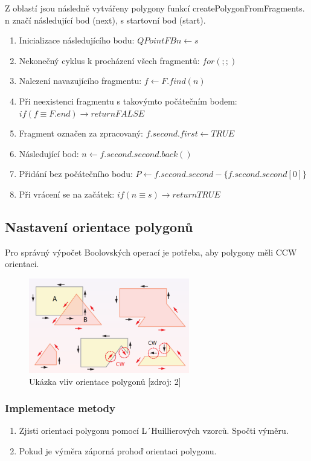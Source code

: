 \documentclass[a4paper, 12pt]{article}
\begin{document}
Z oblastí jsou následně vytvářeny polygony funkcí createPolygonFromFragments. n značí následující bod (next), s startovní bod (start). 

\begin{enumerate}
\item Inicializace následujícího bodu: $QPointFB n \leftarrow s$
\item Nekonečný cyklus k procházení všech fragmentů: $for(;;)$
\item Nalezení navazujícího fragmentu: $f \leftarrow F.find(n)$
\item Při neexistenci fragmentu s takovýmto počátečním bodem: $if(f \equiv F.end) \rightarrow return FALSE$
\item Fragment označen za zpracovaný: $f.second.first \leftarrow TRUE$
\item Následující bod: $n \leftarrow f.second.second.back()$
\item Přidání bez počátečního bodu: $P \leftarrow f.second.second - \{ f.second.second[0]\} $
\item Při vrácení se na začátek: $if (n \equiv s) \rightarrow return TRUE$
\end{enumerate}

\subsection{Nastavení orientace polygonů}
Pro správný výpočet Boolovských operací je potřeba, aby polygony měli CCW orientaci.

\begin{figure}[h!]
	\centering
	\includegraphics[width=7cm]{pictures/orientace.png}
	\caption{Ukázka vliv orientace polygonů [zdroj: 2]}
\end{figure}

\subsubsection{Implementace metody}
\begin{enumerate}
\item Zjisti orientaci polygonu pomocí L´Huillierových vzorců.
\subsubitem Spočti výměru.
\item Pokud je výměra záporná prohoď orientaci polygonu.

\end{enumerate}
\end{document}
